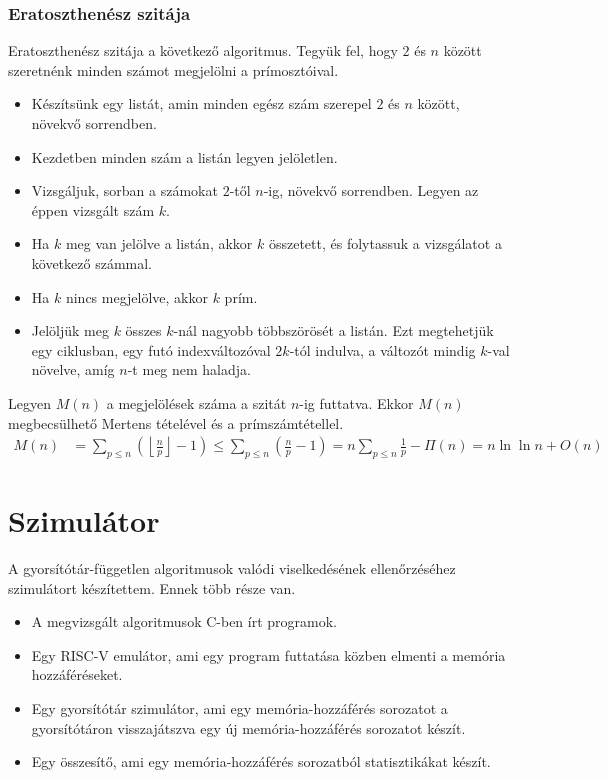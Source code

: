 \documentclass[12pt]{report}
\begin{document}
\subsection{Eratoszthenész szitája}

Eratoszthenész szitája a következő algoritmus.
Tegyük fel, hogy $2$ és $n$ között szeretnénk minden számot megjelölni
a prímosztóival.
\begin{itemize}
\item Készítsünk egy listát, amin minden egész szám szerepel
$2$ és $n$ között, növekvő sorrendben.
\item Kezdetben minden szám a listán legyen jelöletlen.
\item Vizsgáljuk, sorban a számokat $2$-től $n$-ig,
növekvő sorrendben. Legyen az éppen vizsgált szám $k$.
\item Ha $k$ meg van jelölve a listán, akkor $k$ összetett,
és folytassuk a vizsgálatot a következő számmal.
\item Ha $k$ nincs megjelölve, akkor $k$ prím.
\item Jelöljük meg $k$ összes $k$-nál nagyobb többszörösét a listán.
Ezt megtehetjük egy ciklusban, egy futó indexváltozóval $2k$-tól indulva,
a változót mindig $k$-val növelve, amíg $n$-t meg nem haladja.
\end{itemize}

Legyen $M(n)$ a megjelölések száma a szitát $n$-ig futtatva.
Ekkor $M(n)$ megbecsülhető Mertens tételével és a prímszámtétellel.
\begin{align*}
M(n)
&= \sum_{p \le n} \left( \left\lfloor \frac{n}{p} \right\rfloor - 1 \right)
\le \sum_{p \le n} \left( \frac{n}{p} - 1 \right)
= n \sum_{p \le n} \frac{1}{p} - \Pi(n)
= n \ln{\ln{n}} + O(n)
\end{align*}

\chapter{Szimulátor}

A gyorsítótár-független algoritmusok valódi viselkedésének
ellenőrzéséhez szimulátort készítettem.
Ennek több része van.
\begin{itemize}
\item A megvizsgált algoritmusok C-ben írt programok.
\item Egy RISC-V emulátor, ami egy program futtatása közben elmenti
a memória hozzáféréseket.
\item Egy gyorsítótár szimulátor, ami egy memória-hozzáférés sorozatot
a gyorsítótáron visszajátszva egy új memória-hozzáférés sorozatot készít.
\item Egy összesítő, ami egy memória-hozzáférés sorozatból
statisztikákat készít.
\end{itemize}
\end{document}
